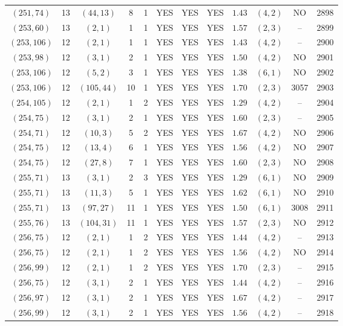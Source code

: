 \begin{longtable}{|c|c|c|c|c|c|c|c|c|c|c|c|}
$(251,74)$ & 13 & $(44,13)$ & 8 & 1 & YES & YES & YES & $1.43$ & $(4,2)$ & NO & 2898\\
$(253,60)$ & 13 & $(2,1)$ & 1 & 1 & YES & YES & YES & $1.57$ & $(2,3)$ & -- & 2899\\
$(253,106)$ & 12 & $(2,1)$ & 1 & 1 & YES & YES & YES & $1.43$ & $(4,2)$ & -- & 2900\\
$(253,98)$ & 12 & $(3,1)$ & 2 & 1 & YES & YES & YES & $1.50$ & $(4,2)$ & NO & 2901\\
$(253,106)$ & 12 & $(5,2)$ & 3 & 1 & YES & YES & YES & $1.38$ & $(6,1)$ & NO & 2902\\
$(253,106)$ & 12 & $(105,44)$ & 10 & 1 & YES & YES & YES & $1.70$ & $(2,3)$ & 3057 & 2903\\
$(254,105)$ & 12 & $(2,1)$ & 1 & 2 & YES & YES & YES & $1.29$ & $(4,2)$ & -- & 2904\\
$(254,75)$ & 12 & $(3,1)$ & 2 & 1 & YES & YES & YES & $1.60$ & $(2,3)$ & -- & 2905\\
$(254,71)$ & 12 & $(10,3)$ & 5 & 2 & YES & YES & YES & $1.67$ & $(4,2)$ & NO & 2906\\
$(254,75)$ & 12 & $(13,4)$ & 6 & 1 & YES & YES & YES & $1.56$ & $(4,2)$ & NO & 2907\\
$(254,75)$ & 12 & $(27,8)$ & 7 & 1 & YES & YES & YES & $1.60$ & $(2,3)$ & NO & 2908\\
$(255,71)$ & 13 & $(3,1)$ & 2 & 3 & YES & YES & YES & $1.29$ & $(6,1)$ & NO & 2909\\
$(255,71)$ & 13 & $(11,3)$ & 5 & 1 & YES & YES & YES & $1.62$ & $(6,1)$ & NO & 2910\\
$(255,71)$ & 13 & $(97,27)$ & 11 & 1 & YES & YES & YES & $1.50$ & $(6,1)$ & 3008 & 2911\\
$(255,76)$ & 13 & $(104,31)$ & 11 & 1 & YES & YES & YES & $1.57$ & $(2,3)$ & NO & 2912\\
$(256,75)$ & 12 & $(2,1)$ & 1 & 2 & YES & YES & YES & $1.44$ & $(4,2)$ & -- & 2913\\
$(256,75)$ & 12 & $(2,1)$ & 1 & 2 & YES & YES & YES & $1.56$ & $(4,2)$ & NO & 2914\\
$(256,99)$ & 12 & $(2,1)$ & 1 & 2 & YES & YES & YES & $1.70$ & $(2,3)$ & -- & 2915\\
$(256,75)$ & 12 & $(3,1)$ & 2 & 1 & YES & YES & YES & $1.44$ & $(4,2)$ & -- & 2916\\
$(256,97)$ & 12 & $(3,1)$ & 2 & 1 & YES & YES & YES & $1.67$ & $(4,2)$ & -- & 2917\\
$(256,99)$ & 12 & $(3,1)$ & 2 & 1 & YES & YES & YES & $1.56$ & $(4,2)$ & -- & 2918\\

\end{longtable}
